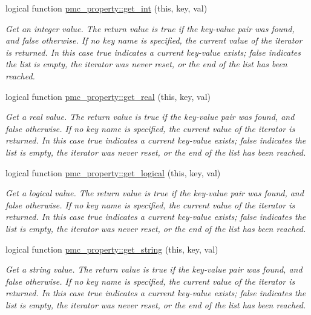 \begin{DoxyCompactItemize}
logical function \mbox{\hyperlink{namespacepmc__property_addbb73ff876bf02aac23350fab5755fd}{pmc\+\_\+property\+::get\+\_\+int}} (this, key, val)
\begin{DoxyCompactList}\small\item\em Get an integer value. The return value is true if the key-\/value pair was found, and false otherwise. If no key name is specified, the current value of the iterator is returned. In this case true indicates a current key-\/value exists; false indicates the list is empty, the iterator was never reset, or the end of the list has been reached. \end{DoxyCompactList}\item 
logical function \mbox{\hyperlink{namespacepmc__property_a97cfe3c7d68a01b1aa164bb25b306a3b}{pmc\+\_\+property\+::get\+\_\+real}} (this, key, val)
\begin{DoxyCompactList}\small\item\em Get a real value. The return value is true if the key-\/value pair was found, and false otherwise. If no key name is specified, the current value of the iterator is returned. In this case true indicates a current key-\/value exists; false indicates the list is empty, the iterator was never reset, or the end of the list has been reached. \end{DoxyCompactList}\item 
logical function \mbox{\hyperlink{namespacepmc__property_a3c3246efe31f72428ecc4d3c6b72304a}{pmc\+\_\+property\+::get\+\_\+logical}} (this, key, val)
\begin{DoxyCompactList}\small\item\em Get a logical value. The return value is true if the key-\/value pair was found, and false otherwise. If no key name is specified, the current value of the iterator is returned. In this case true indicates a current key-\/value exists; false indicates the list is empty, the iterator was never reset, or the end of the list has been reached. \end{DoxyCompactList}\item 
logical function \mbox{\hyperlink{namespacepmc__property_a24b01526021e6f86df84ced42994bdf8}{pmc\+\_\+property\+::get\+\_\+string}} (this, key, val)
\begin{DoxyCompactList}\small\item\em Get a string value. The return value is true if the key-\/value pair was found, and false otherwise. If no key name is specified, the current value of the iterator is returned. In this case true indicates a current key-\/value exists; false indicates the list is empty, the iterator was never reset, or the end of the list has been reached. \end{DoxyCompactList}\item 

\end{DoxyCompactItemize}
